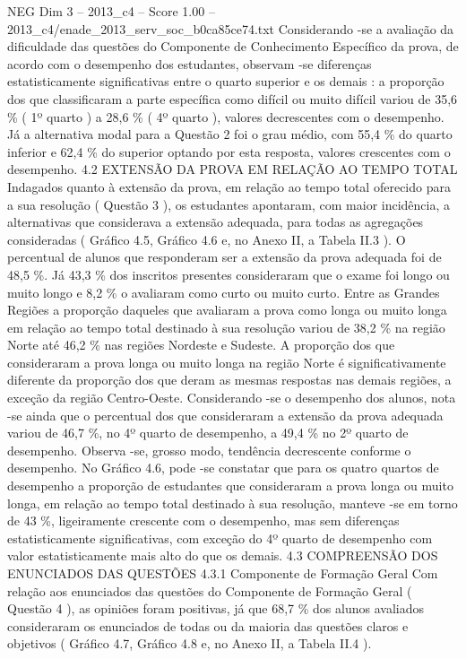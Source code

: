\begin{textsample}{NEG Dim 3 – 2013\_c4 – Score 1.00 – 2013\_c4/enade\_2013\_serv\_soc\_b0ca85ce74.txt}
Considerando -se a avaliação da dificuldade das questões do Componente de Conhecimento Específico da prova, de acordo com o desempenho dos estudantes, observam -se diferenças estatisticamente significativas entre o quarto superior e os demais : a proporção dos que classificaram a parte específica como difícil ou muito difícil variou de 35,6 \% ( 1º quarto ) a 28,6 \% ( 4º quarto ), valores decrescentes com o desempenho.
Já a alternativa modal para a Questão 2 foi o grau médio, com 55,4 \% do quarto inferior e 62,4 \% do superior optando por esta resposta, valores crescentes com o desempenho. 4.2 EXTENSÃO DA PROVA EM RELAÇÃO AO TEMPO TOTAL Indagados quanto à extensão da prova, em relação ao tempo total oferecido para a sua resolução ( Questão 3 ), os estudantes apontaram, com maior incidência, a alternativas que considerava a extensão adequada, para todas as agregações consideradas ( Gráfico 4.5, Gráfico 4.6 e, no Anexo II, a Tabela II.3 ).
O percentual de alunos que responderam ser a extensão da prova adequada foi de 48,5 \%.
Já 43,3 \% dos inscritos presentes consideraram que o exame foi longo ou muito longo e 8,2 \% o avaliaram como curto ou muito curto.
Entre as Grandes Regiões a proporção daqueles que avaliaram a prova como longa ou muito longa em relação ao tempo total destinado à sua resolução variou de 38,2 \% na região Norte até 46,2 \% nas regiões Nordeste e Sudeste.
A proporção dos que consideraram a prova longa ou muito longa na região Norte é significativamente diferente da proporção dos que deram as mesmas respostas nas demais regiões, a exceção da região Centro-Oeste.
Considerando -se o desempenho dos alunos, nota -se ainda que o percentual dos que consideraram a extensão da prova adequada variou de 46,7 \%, no 4º quarto de desempenho, a 49,4 \% no 2º quarto de desempenho.
Observa -se, grosso modo, tendência decrescente conforme o desempenho.
No Gráfico 4.6, pode -se constatar que para os quatro quartos de desempenho a proporção de estudantes que consideraram a prova longa ou muito longa, em relação ao tempo total destinado à sua resolução, manteve -se em torno de 43 \%, ligeiramente crescente com o desempenho, mas sem diferenças estatisticamente significativas, com exceção do 4º quarto de desempenho com valor estatisticamente mais alto do que os demais. 4.3 COMPREENSÃO DOS ENUNCIADOS DAS QUESTÕES 4.3.1 Componente de Formação Geral Com relação aos enunciados das questões do Componente de Formação Geral ( Questão 4 ), as opiniões foram positivas, já que 68,7 \% dos alunos avaliados consideraram os enunciados de todas ou da maioria das questões claros e objetivos ( Gráfico 4.7, Gráfico 4.8 e, no Anexo II, a Tabela II.4 ).

\end{textsample}
